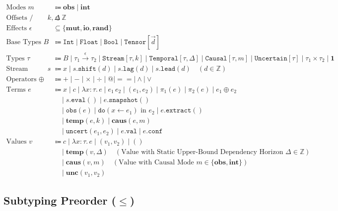 \documentclass[11pt,a4paper]{article}
\theoremstyle{definition}
\theoremstyle{plain}
\newcommand{\ty}[1]{\texttt{#1}}
\newcommand{\sub}{\le}
\newcommand{\Temp}{\ty{Temporal}}
\newcommand{\Stream}{\ty{Stream}}
\newcommand{\Caus}{\ty{Causal}}
\newcommand{\Uncert}{\ty{Uncertain}}
\begin{document}
\begin{align*}
\text{Modes } m &\Coloneqq \mathbf{obs} \mid \mathbf{int} \\
\text{Offsets / Horizons } k, \Delta &\in \mathbb{Z} \\
\text{Effects } \epsilon &\subseteq \{\mathbf{mut}, \mathbf{io}, \mathbf{rand}\} \\
\text{Base Types } B &\Coloneqq \ty{Int} \mid \ty{Float} \mid \ty{Bool} \mid \ty{Tensor}[\vec{d}] \\
\text{Types } \tau &\Coloneqq B \mid \tau_1 \xrightarrow{\epsilon} \tau_2 \mid \Stream[\tau, k] \mid \Temp[\tau, \Delta] \mid \Caus[\tau, m] \mid \Uncert[\tau] \mid \tau_1 \times \tau_2 \mid \mathbf{1} \\[6pt]
\text{Stream Terms } s &\Coloneqq x \mid s.\ty{shift}(d) \mid s.\ty{lag}(d) \mid s.\ty{lead}(d) \quad (d \in \mathbb{Z}) \\
\text{Operators } \oplus &\Coloneqq + \mid - \mid \times \mid \div \mid @ \mid == \mid \land \mid \lor \\
\text{Terms } e &\Coloneqq x \mid c \mid \lambda x:\tau.\, e \mid e_1\, e_2 \mid (e_1, e_2) \mid \pi_1(e) \mid \pi_2(e) \mid e_1 \oplus e_2 \\
&\quad \mid s.\ty{eval}() \mid e.\ty{snapshot}() \\
&\quad \mid \ty{obs}(e) \mid \ty{do}(x \gets e_1) \text{ in } e_2 \mid e.\ty{extract}() \\
&\quad \mid \mathbf{temp}(e, k) \mid \mathbf{caus}(e, m) \\
&\quad \mid \ty{uncert}(e_1, e_2) \mid e.\ty{val} \mid e.\ty{conf} \\[6pt]
\text{Values } v &\Coloneqq c \mid \lambda x:\tau.\, e \mid (v_1, v_2) \mid () \\
&\quad \mid \mathbf{temp}(v, \Delta) \quad (\text{Value with Static Upper-Bound Dependency Horizon } \Delta \in \mathbb{Z}) \\
&\quad \mid \mathbf{caus}(v, m) \quad (\text{Value with Causal Mode } m \in \{\mathbf{obs}, \mathbf{int}\}) \\
&\quad \mid \mathbf{unc}(v_1, v_2)
\end{align*}

\subsection{Subtyping Preorder ($\sub$)}
\end{document}
